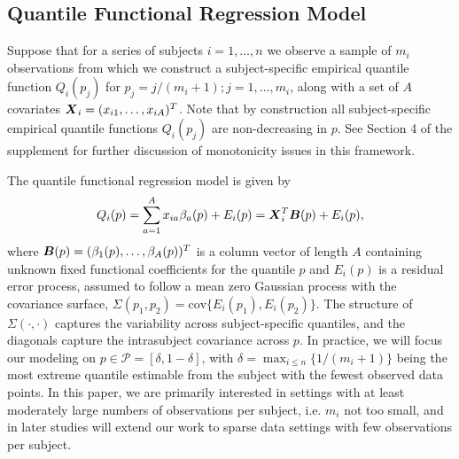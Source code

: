 \documentclass[11pt]{article}
\newcommand{\bB}{\mbox{\boldmath $B$}}
\newcommand{\bX}{\mbox{\boldmath $X$}}
\begin{document}
\subsection{ {\bf Quantile Functional Regression Model}} \label{liter}

Suppose that for a series of subjects $i=1,\ldots,n$ we observe a sample of $m_i$ observations from which we construct a subject-specific empirical quantile function $Q_i(p_j)$ for $p_j=j/(m_i+1); j=1,\ldots, m_i$, along with a set of $A$ covariates  $\bX_i =(x_{i1},\dots, x_{iA})^{T}$.  
Note that by construction all subject-specific empirical quantile functions $Q_i(p_j)$ are non-decreasing in $p$.  See Section 4 of the supplement for further discussion of monotonicity issues in this framework.

The quantile functional regression model is given by
 \begin{equation}
Q_i(p)= \sum_{a=1}^{A}x_{ia}\beta_{a}(p) +  E_i(p)= \bX_i^{T}\bB(p) +  E_i(p),   
 \label{p5_qfm_i}  
\end{equation}
where  $\bB(p)=( \beta_1(p), \dots, \beta_A(p) )^{T}$ is a column vector of length $A$ 
containing unknown fixed functional coefficients for the quantile $p$ and 
   $E_i(p)$ is a residual error process, assumed to follow a mean zero Gaussian process with   
  the covariance surface, $\Sigma(p_1, p_2)=\text{cov}\{ E_i(p_1), E_i(p_2) \}$.  The structure of
  $\Sigma(\cdot,\cdot)$ captures the variability across subject-specific quantiles, and the diagonals capture
  the intrasubject covariance across $p$.   
In practice, we will focus our modeling on $p \in \mathcal{P} = [\delta, 1- \delta]$, with  $\delta=\max_{i\le n}\{1/(m_i+1)\}$ 
being the most extreme quantile estimable from the subject with the fewest observed data points.  In this paper,
we are primarily interested in settings with at least moderately large numbers of observations per subject, i.e. $m_i$ not too small, 
and in later studies will extend our work to sparse data settings with few observations per subject.
\end{document}

